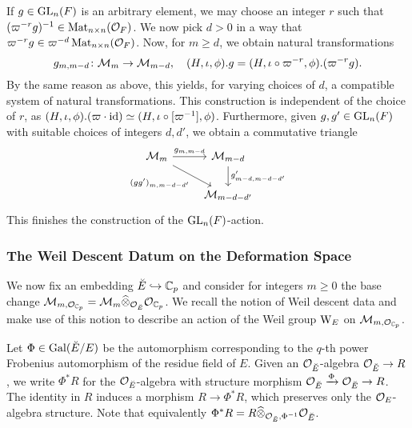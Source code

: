 \documentclass[../main.tex]{subfiles}
\begin{document}
If $g \in \operatorname{GL}_n(F)$ is an arbitrary element, we may choose an integer $r$ such
that $(\varpi^{-r} g)^{-1} \in \operatorname{Mat}_{n \times n}(\mathcal{O}_F)$. We now pick 
$d > 0$ in a way that $\varpi^{-r}g \in \varpi^{-d}\operatorname{Mat}_{n \times n}(\mathcal{O}_F)$. 
Now, for $m \geq d$, we obtain natural transformations
\begin{equation*}
  g_{m,m-d}\colon \mathcal{M}_{m} \to \mathcal{M}_{m-d}, \quad (H, \iota, \phi).g = (H, \iota \circ \varpi^{-r}, \phi).(\varpi^{-r}g).
\end{equation*}
By the same reason as above, this yields, for varying choices of $d$, a
compatible system of natural transformations.
This construction is independent of the choice of $r$, as $(H, \iota,
\phi).(\varpi\cdot\operatorname{id}) \simeq (H, \iota \circ [\varpi^{-1}], \phi)$.
Furthermore, given $g, g' \in \operatorname{GL}_n(F)$ with suitable choices of integers 
$d, d'$, we obtain a commutative triangle
\begin{equation*}
\begin{tikzcd}[ampersand replacement=\&]
	{\cM_{m}} \& {\cM_{m-d}} \\
	\& {\cM_{m-d-d'}}
	\arrow["{g_{m,m-d}}", from=1-1, to=1-2]
	\arrow["{(gg')_{m,m-d-d'}}"', from=1-1, to=2-2]
	\arrow["{g'_{m-d,m-d-d'}}", from=1-2, to=2-2]
\end{tikzcd}
\end{equation*}
This finishes the construction of the $\operatorname{GL}_n(F)$-action.


\subsubsection{The Weil Descent Datum on the Deformation Space} %
\label{ssub:The Weil Descent Datum}
We now fix an embedding ${\breve {E}} \hookrightarrow \mathbb{C}_p$ and consider for integers $m \geq 0$ the
base change $\mathcal{M}_{m, \mathcal{O}_{\mathbb{C}_p}} = \mathcal{M}_m \widehat \otimes_{\mathcal{O}_{\breve {E}}} \mathcal{O}_{\mathbb{C}_p}$. 
We recall the notion of Weil descent data and make use of this notion to describe
an action of the Weil group $\mathrm W_E$ on $\mathcal{M}_{m, \mathcal{O}_{\mathbb{C}_p}}$.

Let $\Phi \in \operatorname{Gal}({\breve {E}} / E)$ be the automorphism corresponding to the
$q$-th power Frobenius automorphism of the residue field of $E$. Given
an $\mathcal{O}_{\breve {E}}$-algebra $\mathcal{O}_{\breve {E}} \to R$, we write $\Phi^*R$ for the 
$\mathcal{O}_{\breve {E}}$-algebra with structure morphism $\mathcal{O}_{\breve {E}} \xrightarrow{\Phi} \mathcal{O}_{\breve {E}} \to R$.
The identity in $R$ induces a morphism $R \to \Phi^* R$, which preserves only the 
$\mathcal{O}_E$-algebra structure. Note that equivalently $\Phi^* R = R
\widehat \otimes_{\mathcal{O}_{\breve {E}}, \Phi^{-1}} \mathcal{O}_{\breve {E}}$.
\end{document}
